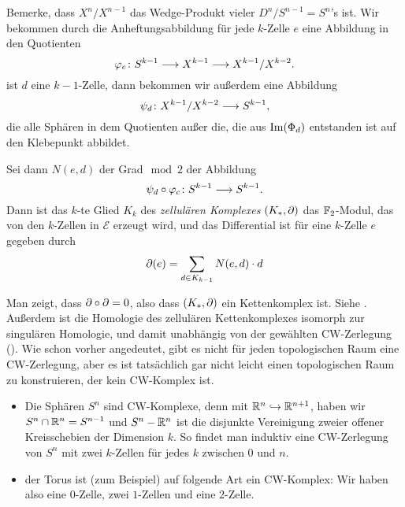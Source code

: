 \begin{definition}
    \label{def: zellulaere homologie}
    Bemerke, dass $X^n / X^{n - 1}$ das Wedge-Produkt vieler $D^n / S^{n-1} = S^n$'s ist. 
    Wir bekommen durch die Anheftungsabbildung für jede $k$-Zelle $e$ eine Abbildung in den 
    Quotienten
    \[ \varphi_e \colon S^{k-1} \longrightarrow X^{k - 1} \longrightarrow X^{k - 1} / X^{k - 2} . \]
    ist $d$ eine $k - 1$-Zelle, dann bekommen wir außerdem eine Abbildung 
    \[ \psi_d \colon X^{k - 1} / X^{k - 2} \longrightarrow S^{k - 1} , \]
    die alle Sphären in dem Quotienten außer die, die aus ${ \operatorname{Im} } (\Phi_d)$ entstanden ist
    auf den Klebepunkt abbildet.

    Sei dann $N(e, d)$ der Grad$\mod 2$ der Abbildung
    \[ \psi_d \circ \varphi_c \colon S^{k - 1} \longrightarrow S^{k - 1} . \]
    Dann ist das $k$-te Glied $K_k$ des \textit{zellulären Komplexes} $(K_{\ast}, { \partial })$ das 
    ${ \mathbb F }_2$-Modul, das von den $k$-Zellen in $\mathcal{E}$ erzeugt wird, und das Differential ist für 
    eine $k$-Zelle $e$ gegeben durch
    \[ { \partial } (e) = \sum_{d \in K_{k  - 1}} N(e, d) \cdot d \] 
\end{definition}

\begin{remark}
    Man zeigt, dass ${ \partial } \circ { \partial } = 0$, also dass $(K_{\ast}, { \partial })$ ein Kettenkomplex ist. 
    Siehe \cite{dold}. Außerdem ist die Homologie des zellulären Kettenkomplexes isomorph zur 
    singulären Homologie, und damit unabhängig von der gewählten CW-Zerlegung (\cite{hatcher}). 
    Wie schon vorher angedeutet, gibt es nicht für jeden topologischen Raum eine CW-Zerlegung,
    aber es ist tatsächlich gar nicht leicht einen topologischen Raum zu konstruieren, der 
    kein CW-Komplex ist.
\end{remark}

\begin{example}
    \begin{itemize}
        \item Die Sphären $S^n$ sind CW-Komplexe, denn mit ${ \mathbb R }^n \hookrightarrow { \mathbb R }^{n + 1}$,
            haben wir $S^n \cap { \mathbb R }^n = S^{n - 1}$ und $S^n - { \mathbb R }^n$ ist die disjunkte Vereinigung
            zweier offener Kreisschebien der Dimension $k$. So findet man induktiv eine CW-Zerlegung
            von $S^n$ mit zwei $k$-Zellen für jedes $k$ zwischen $0$ und $n$.
        \item der Torus ist (zum Beispiel) auf folgende Art ein CW-Komplex:
            Wir haben also eine $0$-Zelle, zwei $1$-Zellen und eine $2$-Zelle.
    \end{itemize}
\end{example}

